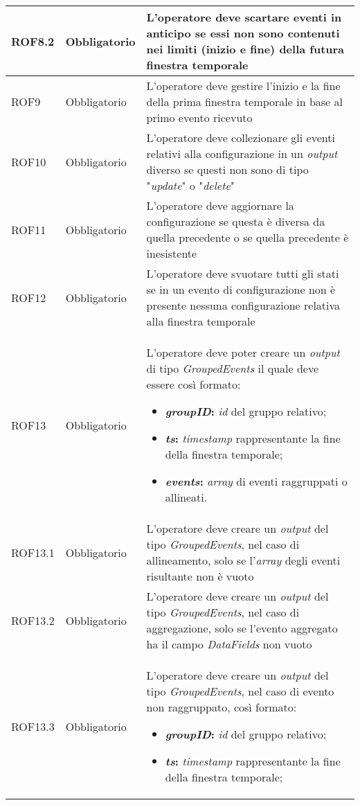 {\begin{longtable}{L{3cm} L{3cm} L{7.5cm}}
\hline
ROF8.2 & Obbligatorio & L'operatore deve scartare eventi in anticipo se essi non sono contenuti nei limiti (inizio e fine) della futura finestra temporale\\
\hline
ROF9 & Obbligatorio & L'operatore deve gestire l'inizio e la fine della prima finestra temporale in base al primo evento ricevuto\\
\hline
ROF10 & Obbligatorio & L'operatore deve collezionare gli eventi relativi alla configurazione in un \textit{output} diverso se questi non sono di tipo "\textit{update}" o "\textit{delete}"\\
\hline
ROF11 & Obbligatorio & L'operatore deve aggiornare la configurazione se questa è diversa da quella precedente o se quella precedente è inesistente\\
\hline
ROF12 & Obbligatorio & L'operatore deve svuotare tutti gli stati se in un evento di configurazione non è presente nessuna configurazione relativa alla finestra temporale\\
\hline
ROF13 & Obbligatorio & L'operatore deve poter creare un \textit{output} di tipo \textit{GroupedEvents} il quale deve essere così formato:
\begin{itemize}
	\item{\textbf{\textit{groupID}:} \textit{id} del gruppo relativo;}
	\item{\textbf{\textit{ts}:} \textit{\gls{timestamp}} rappresentante la fine della finestra temporale;}
	\item{\textbf{\textit{events}:} \textit{array} di eventi raggruppati o allineati.}
\end{itemize}\\
\hline
ROF13.1 & Obbligatorio & L'operatore deve creare un \textit{output} del tipo \textit{GroupedEvents}, nel caso di allineamento, solo se l'\textit{array} degli eventi risultante non è vuoto\\
\hline
ROF13.2 & Obbligatorio & L'operatore deve creare un \textit{output} del tipo \textit{GroupedEvents}, nel caso di aggregazione, solo se l'evento aggregato ha il campo \textit{DataFields} non vuoto\\
\hline
ROF13.3 & Obbligatorio & L'operatore deve creare un \textit{output} del tipo \textit{GroupedEvents}, nel caso di evento non raggruppato, così formato:
\begin{itemize}
	\item{\textbf{\textit{groupID}:} \textit{id} del gruppo relativo;}
	\item{\textbf{\textit{ts}:} \textit{\gls{timestamp}} rappresentante la fine della finestra temporale;}

\end{itemize}
\end{longtable}}
